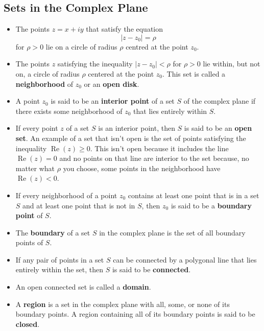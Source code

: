 \documentclass{article}
\renewcommand{\Re}{\operatorname{Re}}
\begin{document}
\subsection{Sets in the Complex Plane}

\begin{itemize}
  \item The points $z = x + i y$ that satisfy the equation \[|z - z_0| = \rho\] for $\rho > 0$ lie on a circle of radius $\rho$ centred at the point $z_0$.

  \item The points $z$ satisfying the inequality $|z - z_0| < \rho$ for $\rho > 0$ lie within, but not on, a circle of radius $\rho$ centered at the point $z_0$. This set is called a \textbf{neighborhood} of $z_0$ or an \textbf{open disk}.

  \item A point $z_0$ is said to be an \textbf{interior point} of a set $S$ of the complex plane if there exists some neighborhood of $z_0$ that lies entirely within $S$.

  \item If every point $z$ of a set $S$ is an interior point, then $S$ is said to be an \textbf{open set}. An example of a set that isn't open is the set of points satisfying the inequality $\Re (z) \ge 0$. This isn't open because it includes the line $\Re (z) = 0$ and no points on that line are interior to the set because, no matter what $\rho$ you choose, some points in the neighborhood have $\Re (z) < 0$.

  \item If every neighborhood of a point $z_0$ contains at least one point that is in a set $S$ and at least one point that is not in $S$, then $z_0$ is said to be a \textbf{boundary point} of $S$.

  \item The \textbf{boundary} of a set $S$ in the complex plane is the set of all boundary points of $S$.

  \item If any pair of points in a set $S$ can be connected by a polygonal line that lies entirely within the set, then $S$ is said to be \textbf{connected}.

  \item An open connected set is called a \textbf{domain}.

  \item A \textbf{region} is a set in the complex plane with all, some, or none of its boundary points. A region containing all of its boundary points is said to be \textbf{closed}.
\end{itemize}
\end{document}
